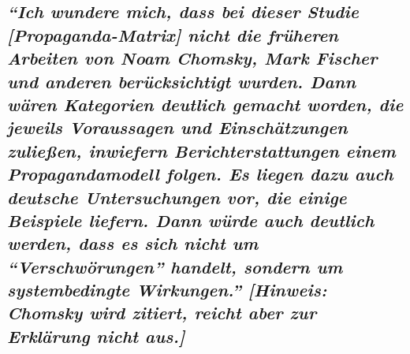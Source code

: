 \hypertarget{ich-wundere-mich-dass-bei-dieser-studie-propaganda-matrix-nicht-die-fruxfcheren-arbeiten-von-noam-chomsky-mark-fischer-und-anderen-beruxfccksichtigt-wurden-dann-wuxe4ren-kategorien-deutlich-gemacht-worden-die-jeweils-voraussagen-und-einschuxe4tzungen-zulieuxdfen-inwiefern-berichterstattungen-einem-propagandamodell-folgen-es-liegen-dazu-auch-deutsche-untersuchungen-vor-die-einige-beispiele-liefern-dann-wuxfcrde-auch-deutlich-werden-dass-es-sich-nicht-um-verschwuxf6rungen-handelt-sondern-um-systembedingte-wirkungen-hinweis-chomsky-wird-zitiert-reicht-aber-zur-erkluxe4rung-nicht-aus}{%
\subsection{\texorpdfstring{\emph{``Ich wundere mich, dass bei dieser
Studie {[}Propaganda-Matrix{]} nicht die früheren Arbeiten von Noam
Chomsky, Mark Fischer und anderen berücksichtigt wurden. Dann wären
Kategorien deutlich gemacht worden, die jeweils Voraussagen und
Einschätzungen zuließen, inwiefern Bericht­erstattungen einem
Propaganda­modell folgen. Es liegen dazu auch deutsche Untersuchungen
vor, die einige Beispiele liefern. Dann würde auch deutlich werden, dass
es sich nicht um ``Verschwörungen'' handelt, sondern um systembedingte
Wirkungen.'' {[}Hinweis: Chomsky wird zitiert, reicht aber zur Erklärung
nicht
aus.{]}}}{``Ich wundere mich, dass bei dieser Studie {[}Propaganda-Matrix{]} nicht die früheren Arbeiten von Noam Chomsky, Mark Fischer und anderen berücksichtigt wurden. Dann wären Kategorien deutlich gemacht worden, die jeweils Voraussagen und Einschätzungen zuließen, inwiefern Bericht­erstattungen einem Propaganda­modell folgen. Es liegen dazu auch deutsche Untersuchungen vor, die einige Beispiele liefern. Dann würde auch deutlich werden, dass es sich nicht um ``Verschwörungen'' handelt, sondern um systembedingte Wirkungen.'' {[}Hinweis: Chomsky wird zitiert, reicht aber zur Erklärung nicht aus.{]}}}\label{ich-wundere-mich-dass-bei-dieser-studie-propaganda-matrix-nicht-die-fruxfcheren-arbeiten-von-noam-chomsky-mark-fischer-und-anderen-beruxfccksichtigt-wurden-dann-wuxe4ren-kategorien-deutlich-gemacht-worden-die-jeweils-voraussagen-und-einschuxe4tzungen-zulieuxdfen-inwiefern-berichterstattungen-einem-propagandamodell-folgen-es-liegen-dazu-auch-deutsche-untersuchungen-vor-die-einige-beispiele-liefern-dann-wuxfcrde-auch-deutlich-werden-dass-es-sich-nicht-um-verschwuxf6rungen-handelt-sondern-um-systembedingte-wirkungen-hinweis-chomsky-wird-zitiert-reicht-aber-zur-erkluxe4rung-nicht-aus}}

